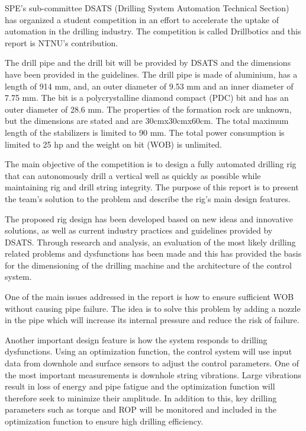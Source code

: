 SPE's sub-committee DSATS (Drilling System Automation Technical Section) has organized a student competition in an effort to accelerate the uptake of automation in the drilling industry. The competition is called Drillbotics \texttrademark and this report is NTNU's contribution. 

The drill pipe and the drill bit will be provided by DSATS and the dimensions have been provided in the guidelines. The drill pipe is made of aluminium, has a length of 914 mm, and, an outer diameter of 9.53 mm and an inner diameter of 7.75 mm. The bit is a polycrystalline diamond compact (PDC) bit and has an outer diameter of 28.6 mm. The properties of the formation rock are unknown, but the dimensions are stated and are 30cmx30cmx60cm. The total maximum length of the stabilizers is limited to 90 mm. The total power consumption is limited to 25 hp and the weight on bit (WOB) is unlimited.

The main objective of the competition is to design a fully automated drilling rig that can autonomously drill a vertical well as quickly as possible while maintaining rig and drill string integrity. The purpose of this report is to present the team's solution to the problem and describe the rig's main design features.

The proposed rig design has been developed based on new ideas and innovative solutions, as well as current industry practices and guidelines provided by DSATS. Through research and analysis, an evaluation of the most likely drilling related problems and dysfunctions has been made and this has provided the basis for the dimensioning of the drilling machine and the architecture of the control system.

One of the main issues addressed in the report is how to ensure sufficient WOB without causing pipe failure. The idea is to solve this problem by adding a nozzle in the pipe which will increase its internal pressure and reduce the risk of failure. 

Another important design feature is how the system responds to drilling dysfunctions. Using an optimization function, the control system will use input data from downhole and surface sensors to adjust the control parameters. One of the most important measurements is downhole string vibrations. Large vibrations result in loss of energy and pipe fatigue and the optimization function will therefore seek to minimize their amplitude. In addition to this, key drilling parameters such as torque and ROP will be monitored and included in the optimization function to ensure high drilling efficiency.